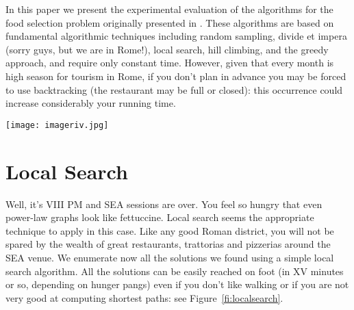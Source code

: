 \documentclass[twocolumn,10pt]{article}
\newcommand{\conference}{SEA\xspace}
\begin{document}
In this paper we present the experimental evaluation of the algorithms for the food selection 
problem originally presented in \cite{pigout}. These algorithms are based on fundamental algorithmic 
techniques including random sampling, divide et impera (sorry guys, 
but we are in  Rome!), local search, hill climbing, and the greedy 
approach, and require only constant time. However, given that every month 
is high season for tourism in Rome, if you don't plan in advance you 
may be forced to use backtracking (the restaurant may be full or 
closed): this occurrence could increase considerably your running 
time.


\begin{figure*}[t!]
\begin{center}
\texttt{[image: imageriv.jpg]}
\end{center}
\caption{Food selection by local search. The yellow point is the
\conference conference venue.\label{fi:localsearch}}
\end{figure*}

\section{Local Search}
\label{se:localsearch}

Well, it's VIII PM and \conference sessions are over. You feel so hungry that 
even power-law graphs look like fettuccine. Local search seems the 
appropriate technique to apply in this case. Like any good Roman 
district, you will not be spared by the wealth of great restaurants, 
trattorias and pizzerias around the \conference venue. We enumerate now all the solutions we found using a simple local search algorithm. 
All the solutions can be easily reached on foot (in XV minutes or so, 
depending on hunger pangs) even if you don't like walking or if you 
are not very good at computing shortest paths: see 
Figure~\ref{fi:localsearch}.  
\end{document}
